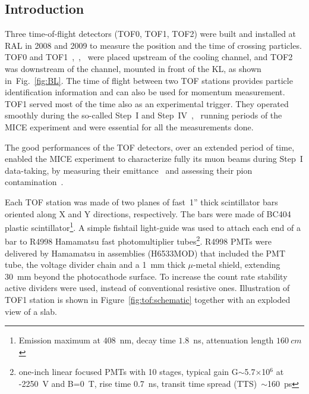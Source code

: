 
\subsection{Introduction}
\label{SubSect:TOF_Intro}

Three time-of-flight detectors (TOF0, TOF1, TOF2) were built and
installed at RAL in 2008 and 2009 to measure the position and the time
of crossing particles.  TOF0 and
TOF1~\cite{NOTE145},~\cite{NOTE241},~\cite{2010NIMPA.615...14B} were
placed upstream of the cooling channel, and TOF2~\cite{NOTE286} was
downstream of the channel, mounted in front of the KL, as shown
in~Fig.~\ref{fig:BL}.  The time of flight between two TOF stations
provides particle identification information and can also be used for
momentum measurement. TOF1 served most of the time also as an
experimental trigger.  They operated smoothly during the so-called
Step~I and Step~IV~\cite{Rajaram:2015bra},~\cite{2015ehep.confE.521B}
running periods of the MICE experiment and were essential for all the
measurements done.

The good performances of the TOF detectors, over an extended period of time,
enabled the MICE experiment to characterize fully its muon beams during
Step~I data-taking, by measuring their emittance~\cite{2013arXiv1306.1509T} and
assessing their pion contamination~\cite{2016JInst..11P3001A}.

Each TOF station was made of two planes of fast~1'' thick scintillator
bars oriented along X and Y directions, respectively. The bars were
made of BC404 plastic scintillator\footnote{Emission maximum at
  $408$~nm, decay time $1.8$~ns, attenuation length $160~cm$}. A
simple fishtail light-guide was used to attach each end of a bar to
R4998 Hamamatsu fast photomultiplier tubes\footnote{one-inch linear
  focused PMTs with 10 stages, typical gain G$\sim$5.7$\times$10$^6$
  at -2250~V and B=0~T, rise time 0.7~ns, transit time spread
  (TTS)~$\sim$160~ps}.  R4998 PMTs were delivered by Hamamatsu in
assemblies (H6533MOD) that included the PMT tube, the voltage divider
chain and a 1~mm thick $\mu$-metal shield, extending 30~mm beyond the
photocathode surface.  To increase the count rate stability active
dividers were used, instead of conventional resistive
ones. Illustration of TOF1 station is shown in
Figure~\ref{fig:tof:schematic} together with an exploded view of a
slab.

